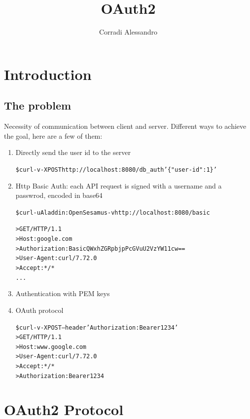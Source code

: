 \documentclass{style}
\title{OAuth2}
\author{Corradi Alessandro}
\begin{document}
\maketitle{}
\tableofcontents
\clearpage
{}

\section{Introduction}
\subsection{The problem}

Necessity of communication between client and server.
Different ways to achieve the goal, here are a few of them:
\begin{enumerate}
    \item Directly send the user id to the server
    \begin{alltt}
\$ curl -v -X POST http://localhost:8080/db_auth '\{"user-id": 1\}'
    \end{alltt}

    \item Http Basic Auth: each API request is signed with a username and a passwrod, encoded in base64
    \begin{alltt}
\$ curl -u Aladdin:OpenSesamus -v http://localhost:8080/basic

> GET / HTTP/1.1
> Host: google.com
> Authorization: Basic QWxhZGRpbjpPcGVuU2VzYW11cw==
> User-Agent: curl/7.72.0
> Accept: */*
...
    \end{alltt}

    \item Authentication with PEM keys
    \item OAuth protocol
    \begin{alltt}
\$ curl -v -X POST --header 'Authorization: Bearer 1234'
> GET / HTTP/1.1
> Host: www.google.com
> User-Agent: curl/7.72.0
> Accept: */*
> Authorization: Bearer 1234
    \end{alltt}
\end{enumerate}


\section{OAuth2 Protocol}
\subsection{}
\end{document}
